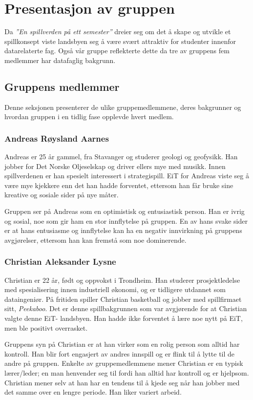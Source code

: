 \section{Presentasjon av gruppen}
Da \emph{''En spillverden på ett semester''} dreier seg om det å skape
og utvikle et spillkonsept viste landsbyen seg å være svært attraktiv
for studenter innenfor datarelaterte fag. Også vår gruppe reflekterte
dette da tre av gruppens fem medlemmer har datafaglig bakgrunn.

\subsection{Gruppens medlemmer}\label{sec:members}
Denne seksjonen presenterer de ulike gruppemedlemmene, deres bakgrunner
og hvordan gruppen i en tidlig fase opplevde hvert medlem.
	\subsubsection{Andreas Røysland Aarnes}
	Andreas er 25 år gammel, fra Stavanger og studerer geologi og geofysikk. Han jobber for Det Norske Oljeselskap og driver ellers mye med musikk. Innen spillverdenen er han spesielt interessert i strategispill. EiT for Andreas viste seg å være mye kjekkere enn det han hadde forventet, ettersom han får bruke sine kreative og sosiale sider på nye måter. 

	Gruppen ser på Andreas som en optimistisk og entusiastisk person. Han er ivrig og sosial, noe som gir ham en stor innflytelse på gruppen. En av hans svake sider er at hans entusiasme og innflytelse kan ha en negativ innvirkning på gruppens avgjørelser, ettersom han kan fremstå som noe dominerende.

	\subsubsection{Christian Aleksander Lysne}
	Christian er 22 år, født og oppvokst i Trondheim. Han studerer prosjektledelse med spesialisering innen industriell økonomi, og er tidligere utdannet som dataingeniør. På fritiden spiller Christian basketball og jobber med spillfirmaet sitt, \emph{Peekaboo}. Det er denne spillbakgrunnen som var avgjørende for at Christian valgte denne EiT- landsbyen. Han hadde ikke forventet å lære noe nytt på EiT, men ble positivt overrasket.   

	Gruppens syn på Christian er at han virker som en rolig person som alltid har kontroll. Han blir fort engasjert av andres innspill og er flink til å lytte til de andre på gruppen. Enkelte av gruppemedlemmene mener Christian er en typisk lærer/leder; en man henvender seg til fordi han alltid har kontroll og er hjelpsom. Christian mener selv at han har en tendens til å kjede seg når han jobber med det samme over en lengre periode. Han liker variert arbeid.

